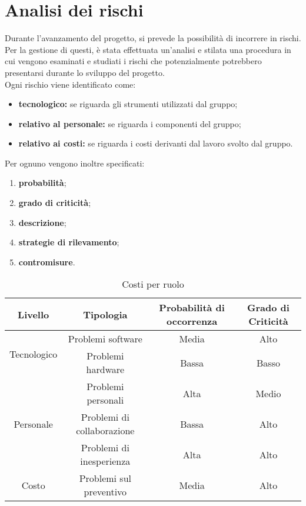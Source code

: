 \section{Analisi dei rischi}
Durante l'avanzamento del progetto, si prevede la possibilità di incorrere in rischi. Per la gestione di questi, è stata effettuata un'analisi e stilata una procedura in cui vengono esaminati e studiati i rischi che potenzialmente potrebbero presentarsi durante lo sviluppo del progetto. \\
Ogni rischio viene identificato come:
\begin{itemize}
\item \textbf{tecnologico:} se riguarda gli strumenti utilizzati dal gruppo;
\item \textbf{relativo al personale:} se riguarda i componenti del gruppo;
\item \textbf{relativo ai costi:} se riguarda i costi derivanti dal lavoro svolto dal gruppo.
\end{itemize}
Per ognuno vengono inoltre specificati:
\begin{enumerate}
	\item \textbf{probabilità};
	\item \textbf{grado di criticità};
	\item \textbf{descrizione};
	\item \textbf{strategie di rilevamento};
	\item \textbf{contromisure}.
\end{enumerate}

\begin{table}[H]
	\centering
	\begin{tabular}{|c|c|c|c|}
		\hline
		\textbf{Livello} &
		\textbf{Tipologia} &
		\textbf{Probabilità di occorrenza} &
		\textbf{Grado di Criticità}\\
		\hline
		\multirow{2}{*}{Tecnologico} & Problemi software & Media & Alto \\\cline{2-4}
									  & Problemi hardware & Bassa & Basso \\
		\hline
		\multirow{3}{*}{Personale} & Problemi personali & Alta & Medio \\\cline{2-4}
								   & Problemi di collaborazione & Bassa & Alto \\\cline{2-4}
								   & Problemi di inesperienza & Alta & Alto \\
		\hline
		Costo &  Problemi sul preventivo & Media & Alto \\
		\hline
	\end{tabular}
	\caption{Costi per ruolo}
\end{table}

